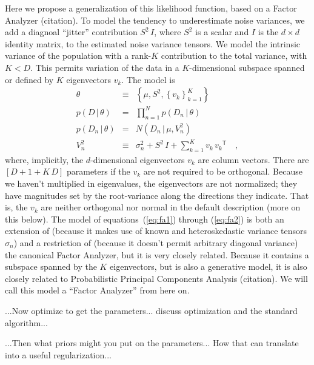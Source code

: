 \documentclass[12pt]{article}
\newcommand{\equationname}{equation}
\newcommand{\equationnames}{\equationname s}
\newcommand{\given}{\,|\,}
\newcommand{\setof}[1]{\left\{{#1}\right\}}
\newcommand{\transpose}[1]{{#1}^{\!{\mathsf{T}}}}
\begin{document}
Here we propose a generalization of this likelihood function, based on
a Factor Analyzer (citation).  To model the tendency to underestimate
noise variances, we add a diagnoal ``jitter'' contribution $S^2\,I$,
where $S^2$ is a scalar and $I$ is the $d\times d$ identity matrix, to
the estimated noise variance tensors.  We model the intrinsic variance
of the population with a rank-$K$ contribution to the total variance,
with $K<D$.  This permits variation of the data in a $K$-dimensional
subspace spanned or defined by $K$ eigenvectors $v_k$.  The model is
\begin{eqnarray}\label{eq:fa1}
\theta
 &\equiv&
\setof{\mu, S^2, \setof{v_k}_{k=1}^K}
\\
p(D\given\theta)
 &=&
\prod_{n=1}^N p(D_n\given\theta)
\\
p(D_n\given\theta)
 &=&
N(D_n\given\mu,V^2_n)
\\\label{eq:fa2}
V^2_n
 &\equiv&
\sigma^2_n + S^2\,I + \sum_{k=1}^K v_k\,\transpose{v_k}
\quad ,
\end{eqnarray}
where, implicitly, the $d$-dimensional eigenvectors $v_k$ are column
vectors.  There are $[D + 1 + K\,D]$ parameters if the $v_k$ are not
required to be orthogonal.  Because we haven't multiplied in
eigenvalues, the eigenvectors are not normalized; they have magnitudes
set by the root-variance along the directions they indicate.  That is,
the $v_k$ are neither orthogonal nor normal in the default description
(more on this below).  The model of \equationnames~(\ref{eq:fa1})
through (\ref{eq:fa2}) is both an extension of (because it makes use
of known and heteroskedastic variance tensors $\sigma_n$) and a
restriction of (because it doesn't permit arbitrary diagonal variance)
the canonical Factor Analyzer, but it is very closely related.
Because it contains a subspace spanned by the $K$ eigenvectors, but is
also a generative model, it is also closely related to Probabilistic
Principal Components Analysis (citation).  We will call this model a
``Factor Analyzer'' from here on.

...Now optimize to get the parameters... discuss optimization and the
standard algorithm...

...Then what priors might you put on the parameters... How that can
translate into a useful regularization...
\end{document}
